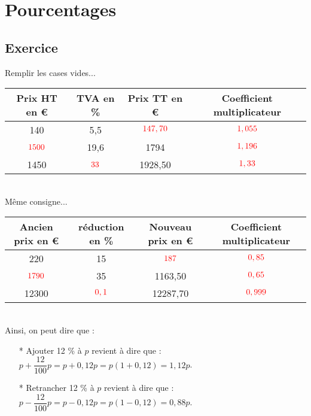 \ifdefined\COMPLETE
\else
    
    
\fi

\section{Pourcentages}

\subsection{Exercice }

Remplir les cases vides... \\

\begin{tabular}{c|c|c|c} 
Prix HT en € & TVA en \% & Prix TT en € & Coefficient multiplicateur \\
\hline
140 & 5,5 & $\textcolor{red}{147,70}$ & $\textcolor{red}{1,055}$ \\
$\textcolor{red}{1500}$& 19,6 & 1794 & $\textcolor{red}{ 1,196}$ \\
1450 & $\textcolor{red}{33}$ & 1928,50 & $\textcolor{red}{1,33}$ \\
\end{tabular} \\

Même consigne... \\

\begin{tabular}{c|c|c|c} 
Ancien prix en € & réduction en \% & Nouveau prix en € & Coefficient multiplicateur \\
\hline
220 & 15 & $\textcolor{red}{187}$ & $\textcolor{red}{0,85}$ \\
$\textcolor{red}{1790}$& 35 & 1163,50 & $\textcolor{red}{0,65}$ \\
12300 & $\textcolor{red}{0,1}$ & 12287,70 & $\textcolor{red}{0,999}$ \\
\end{tabular} \\

Ainsi, on peut dire que : 

\begin{enumerate}
\item[*] Ajouter 12 \% à $p$ revient à dire que : $ p + \dfrac{12}{100}p = p + 0,12p = p \left(1 + 0,12\right) = 1,12 p$.
\item[*] Retrancher 12 \% à $p$ revient à dire que : $ p - \dfrac{12}{100}p = p - 0,12p = p \left(1 - 0,12\right) = 0,88 p$.
\end{enumerate}

